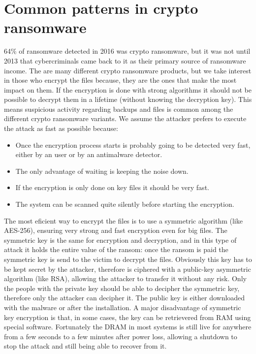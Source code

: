 \section{Common patterns in crypto ransomware}
64\% of ransomware detected in 2016 was crypto ransomware\cite{ransomware_digital_extortion}, but it was not until 2013 that cybercriminals came back to it as their primary source of ransomware income\cite{ransomware_oReilly}.
The are many different crypto ransomware products, but we take interest in those who encrypt the files because, they are the ones that make the most impact on them.
If the encryption is done with strong algorithms it should not be possible to decrypt them in a lifetime (without knowing the decryption key).
\linej
\linej
This means suspicious activity regarding backups and files is common among the different crypto ransomware variants.
We assume the attacker prefers to execute the attack as fast as possible because:
\begin{itemize}
\item Once the encryption process starts is probably going to be detected very fast, either by an user or by an antimalware detector.
\item The only advantage of waiting is keeping the noise down.
\item If the encryption is only done on key files it should be very fast.
\item The system can be scanned quite silently before starting the encryption.
\end{itemize}
\linej
The most eficient way to encrypt the files is to use a symmetric algorithm (like AES-256), ensuring very strong and fast encryption even for big files.
The symmetric key is the same for encryption and decryption, and in this type of attack it holds the entire value of the ransom: once the ransom is paid the symmetric key is send to the victim to decrypt the files.
\linej
Obviously this key has to be kept secret by the attacker, therefore is ciphered with a public-key asymmetric algorithm (like RSA), allowing the attacker to transfer it without any risk.
Only the people with the private key should be able to decipher the symmetric key, therefore only the attacker can decipher it.
The public key is either downloaded with the malware or after the installation.
\linej
A major disadvantage of symmetric key encryption is that, in some cases, the key can be retrievered from RAM using special software.
Fortunately the DRAM in most systems is still live for anywhere from a few seconds to a few minutes after power loss, allowing a shutdown to stop the attack and still being able to recover from it.
